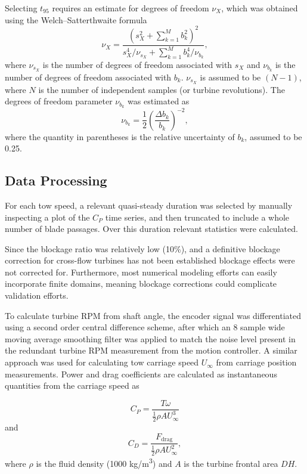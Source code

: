 \documentclass[10pt,letterpaper]{article}
\begin{document}
Selecting $t_{95}$ requires an estimate for degrees of freedom $\nu_X$, which
was obtained using the Welch--Satterthwaite formula
\begin{equation}
    \nu_X = \frac{\left(s_X^2 + \sum_{k=1}^M b_k^2 \right)^2} {s_X^4/\nu_{s_X} +
    \sum_{k=1}^M b_k^4/\nu_{b_k}},
\end{equation}
where $\nu_{s_X}$ is the number of degrees of freedom associated with $s_X$ and
$\nu_{b_k}$ is the number of degrees of freedom associated with $b_k$.
$\nu_{s_X}$ is assumed to be $(N-1)$, where $N$ is the number of independent
samples (or turbine revolutions). The degrees of freedom parameter $\nu_{b_k}$
was estimated as
\begin{equation}
    \nu_{b_k} = \frac{1}{2} \left( \frac{\Delta b_k}{b_k} \right)^{-2},
\end{equation}
where the quantity in parentheses is the relative uncertainty of $b_k$, assumed
to be 0.25.


\subsection*{Data Processing}

For each tow speed, a relevant quasi-steady duration was selected by manually
inspecting a plot of the $C_P$ time series, and then truncated to include a
whole number of blade passages. Over this duration relevant statistics were
calculated. 

Since the blockage ratio was relatively low (10\%), and a definitive blockage
correction for cross-flow turbines has not been established \cite{Cavagnaro2014}
blockage effects were not corrected for. Furthermore, most numerical modeling
efforts can easily incorporate finite domains, meaning blockage corrections
could complicate validation efforts.

To calculate turbine RPM from shaft angle, the encoder signal was differentiated
using a second order central difference scheme, after which an 8 sample wide
moving average smoothing filter was applied to match the noise level present in
the redundant turbine RPM measurement from the motion controller. A similar
approach was used for calculating tow carriage speed $U_\infty$ from carriage
position measurements. Power and drag coefficients are calculated as
instantaneous quantities from the carriage speed as

\begin{equation}
    C_P = \frac{T \omega}{\frac{1}{2} \rho A U_\infty^3}
\end{equation}
and
\begin{equation}
    C_D = \frac{F_\mathrm{drag}}{\frac{1}{2} \rho A U_\infty^2},
\end{equation}
where $\rho$ is the fluid density (1000 kg/m\textsuperscript{3}) and $A$ is
the turbine frontal area $DH$.
\end{document}

